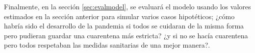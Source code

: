 Finalmente, en la sección \ref{sec:evalmodel}, se evaluará el modelo usando los valores estimados en la sección anterior para simular varios casos hipotéticos; ¿cómo habría sido el desarrollo de la pandemia si todos se cuidaran de la misma forma pero pudieran guardar una cuarentena más estricta? ¿y si no se hacía cuarentena pero todos respetaban las medidas sanitarias de una mejor manera?.











